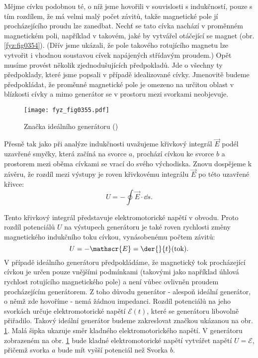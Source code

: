   Mějme cívku podobnou té, o níž jsme hovořili v souvislosti s indukčností, pouze s tím rozdílem, 
  že má velmi malý počet závitů, takže magnetické pole jí procházejícího proudu lze zanedbat. Nechť 
  se tato cívka nachází v proměnném magnetickém poli, například v takovém, jaké by vytvářel 
  otáčející se magnet (obr. \ref{fyz:fig0354}). (Dřív jsme ukázali, že pole takového rotujícího 
  magnetu lze vytvořit i vhodnou soustavou cívek napájených střídavým proudem.) Opět musíme provést 
  několik zjednodušujících předpokladů. Jde o všechny ty předpoklady, které jsme popsali v případě 
  idealizované cívky. Jmenovitě budeme předpokládat, že proměnné magnetické pole je omezeno na 
  určitou oblast v blízkosti cívky a mimo generátor se v prostoru mezi svorkami neobjevuje.

  \begin{figure}[ht!] %
    \centering
    \texttt{[image: fyz\_fig0355.pdf]}
    \caption{Značka ideálního generátoru
             (\cite[s.~396]{Feynman02})}
    \label{fyz:fig0355}
  \end{figure}
  
  Přesně tak jako při analýze indukčnosti uvažujeme křivkový integrál \(\vec{E}\) podél uzavřené 
  smyčky, která začíná na svorce \(a\), prochází cívkou ke svorce \(b\) a prostorem mezi oběma 
  cívkami se vrací do svého východiska. Znovu dospějeme k závěru, že rozdíl mezi výstupy je roven 
  křivkovému integrálu \(\vec{E}\) po této uzavřené křivce:
  \begin{equation}\label{fyz:eq478}
   U = -\oint\vec{E}\cdot\dd{s}.
  \end{equation}

  Tento křivkový integrál představuje elektromotorické napětí v obvodu. Proto rozdíl potenciálů 
  \(U\) na výstupech generátoru je také roven rychlosti změny magnetického indukčního toku cívkou, 
  vynásobenému počtem závitů:
  \begin{equation}\label{fyz:eq479}
   U = -\mathscr{E} = \der{ }{t}(\text{tok}).
  \end{equation}
  V případě ideálního generátoru předpokládáme, že magnetický tok procházející cívkou je určen 
  pouze vnějšími podmínkami (takovými jako například úhlová rychlost rotujícího magnetického pole) 
  a není vůbec ovlivněn proudem procházejícím generátorem. Z toho důvodu generátor - alespoň 
  ideální generátor, o němž zde hovoříme - nemá žádnou impedanci. Rozdíl potenciálů na jeho 
  svorkách určuje elektromotorické napětí \(\mathscr{E}(t)\), které se generátoru libovolně 
  přiřadilo. Takový ideální generátor budeme zakreslovat značkou ukázanou na obr. \ref{fyz:fig0355}. 
  Malá šipka ukazuje směr kladného elektromotorického napětí. V generátoru zobrazeném na obr. 
  \ref{fyz:fig0355} bude kladné elektromotorické napětí vytvářet napětí \(U=\mathscr{E}\), přičemž 
  svorka \(a\) bude mít vyšší potenciál než Svorka \(b\).
  
